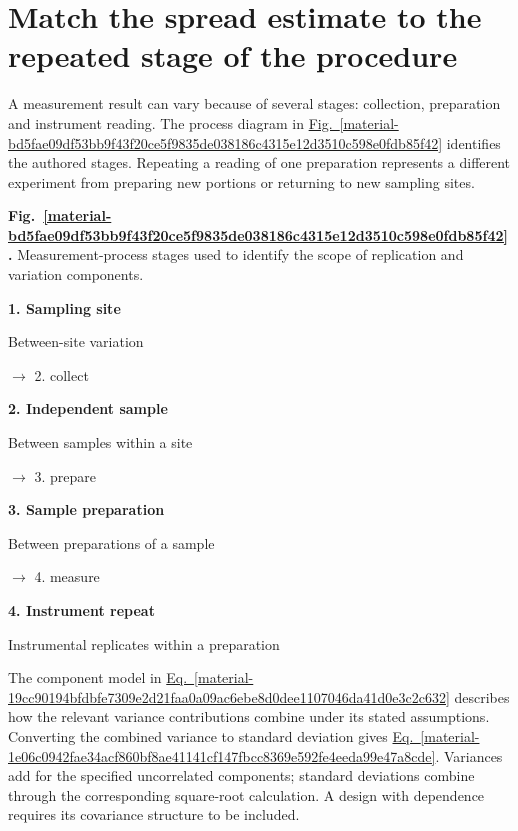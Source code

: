 \documentclass[11pt,a4paper]{article}
\begin{document}
\medskip

\clearpage
\section{Match the spread estimate to the repeated stage of the procedure}
A measurement result can vary because of several stages: collection, preparation and instrument reading. The process diagram in \hyperref[material-bd5fae09df53bb9f43f20ce5f9835de038186c4315e12d3510c598e0fdb85f42]{Fig.~\ref*{material-bd5fae09df53bb9f43f20ce5f9835de038186c4315e12d3510c598e0fdb85f42}} identifies the authored stages. Repeating a reading of one preparation represents a different experiment from preparing new portions or returning to new sampling sites.


\par\medskip
\Needspace{10cm}
\label{material-bd5fae09df53bb9f43f20ce5f9835de038186c4315e12d3510c598e0fdb85f42}
\noindent\textbf{Fig.~\ref*{material-bd5fae09df53bb9f43f20ce5f9835de038186c4315e12d3510c598e0fdb85f42}.} Measurement-process stages used to identify the scope of replication and variation components.\par\nopagebreak
\par\medskip\noindent\textcolor{pcd1}{\textbf{1. Sampling site}}\par
Between-site variation

\par\noindent $\longrightarrow$ 2. collect
\par\medskip\noindent\textcolor{pcd2}{\textbf{2. Independent sample}}\par
Between samples within a site

\par\noindent $\longrightarrow$ 3. prepare
\par\medskip\noindent\textcolor{pcd3}{\textbf{3. Sample preparation}}\par
Between preparations of a sample

\par\noindent $\longrightarrow$ 4. measure
\par\medskip\noindent\textcolor{pcd4}{\textbf{4. Instrument repeat}}\par
Instrumental replicates within a preparation


\medskip

The component model in \hyperref[material-19cc90194bfdbfe7309e2d21faa0a09ac6ebe8d0dee1107046da41d0e3c2c632]{Eq.~\ref*{material-19cc90194bfdbfe7309e2d21faa0a09ac6ebe8d0dee1107046da41d0e3c2c632}} describes how the relevant variance contributions combine under its stated assumptions. Converting the combined variance to standard deviation gives \hyperref[material-1e06c0942fae34acf860bf8ae41141cf147fbcc8369e592fe4eeda99e47a8cde]{Eq.~\ref*{material-1e06c0942fae34acf860bf8ae41141cf147fbcc8369e592fe4eeda99e47a8cde}}. Variances add for the specified uncorrelated components; standard deviations combine through the corresponding square-root calculation. A design with dependence requires its covariance structure to be included.
\end{document}
